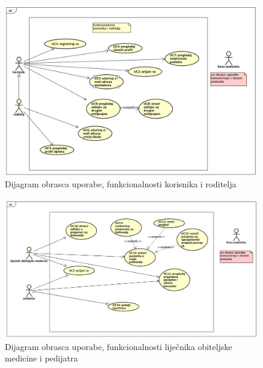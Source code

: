 					\begin{figure}[H]
						\includegraphics[width=\textwidth]{slike/uc_korisnik.png} 
						\caption{Dijagram obrasca uporabe, funkcionalnosti korisnika i roditelja}
						\label{fig:promjene2} 
					\end{figure}
					\begin{figure}[H]
						\includegraphics[width=\textwidth]{slike/uc_dr.png} 
						\caption{Dijagram obrasca uporabe, funkcionalnosti liječnika obiteljske medicine i pedijatra}
						\label{fig:promjene2} 
					\end{figure}
